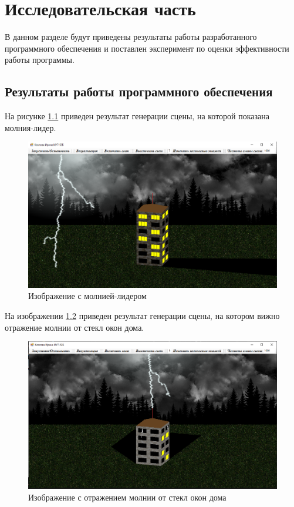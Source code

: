 \chapter{Исследовательская часть}

В данном разделе будут приведены результаты работы разработанного программного обеспечения и поставлен эксперимент по оценки эффективности работы программы.

\section{Результаты работы программного обеспечения}

На рисунке \ref{img:t1} приведен результат генерации сцены, на которой показана молния-лидер.

\begin{figure}[H]
	\begin{center}
		\includegraphics[scale=0.38]{img/prog_res/t1.png}
	\end{center}
	\captionsetup{justification=centering}
	\caption{Изображение с молнией-лидером}
	\label{img:t1}
\end{figure}

На изображении \ref{img:t2} приведен результат генерации сцены, на котором вижно отражение молнии от стекл окон дома.

\begin{figure}[H]
	\begin{center}
		\includegraphics[scale=0.38]{img/prog_res/t2.png}
	\end{center}
	\captionsetup{justification=centering}
	\caption{Изображение с отражением молнии от стекл окон дома}
	\label{img:t2}
\end{figure}

